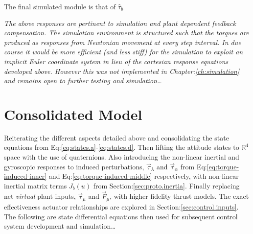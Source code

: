 \par
The final simulated module is that of $\hat{\tau}_b$
\par
\emph{\color{Gray}The above responses are pertinent to simulation and plant dependent feedback compensation. The simulation environment is structured such that the torques are produced as responses from Newtonian movement at every step interval. In due course it would be more efficient (and less stiff) for the simulation to exploit an implicit Euler\cite{physicallybased,multibodydynamics} coordinate system in lieu of the cartesian response equations developed above. However this was not implemented in Chapter:\ref{ch:simulation} and remains open to further testing and simulation\ldots}
\section{Consolidated Model}
\label{sec:dynamics.model}
Reiterating the different aspects detailed above and consolidating the state equations from Eq:\ref{eq:states.a}-\ref{eq:states.d}. Then lifting the attitude states to $\mathbb{R}^4$ space with the use of quaternions. Also introducing the non-linear inertial and gyroscopic responses to induced perturbations, $\vec{\tau}_\lambda$ and $\vec{\tau}_\alpha$ from Eq:\ref{eq:torque-induced-inner} and Eq:\ref{eq:torque-induced-middle} respectively, with non-linear inertial matrix terms $J_b(u)$ from Section:\ref{sec:proto.inertia}. Finally replacing net \emph{virtual} plant inputs, $\vec{\tau}_\mu$ and $\vec{F}_\mu$, with higher fidelity thrust models. The exact effectiveness actuator relationships are explored in Section:\ref{sec:control.inputs}. The following are state differential equations then used for subsequent control system development and simulation\ldots
\\
